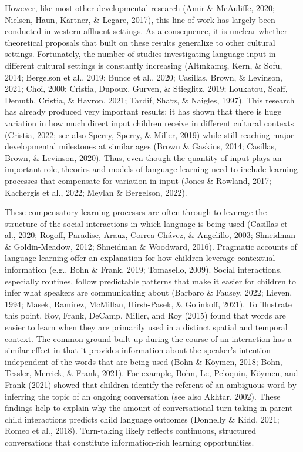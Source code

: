 \documentclass[
  man,floatsintext]{apa6}
\begin{document}
However, like most other developmental research (Amir \& McAuliffe, 2020; Nielsen, Haun, Kärtner, \& Legare, 2017), this line of work has largely been conducted in western affluent settings. As a consequence, it is unclear whether theoretical proposals that built on these results generalize to other cultural settings. Fortunately, the number of studies investigating language input in different cultural settings is constantly increasing (Altınkamış, Kern, \& Sofu, 2014; Bergelson et al., 2019; Bunce et al., 2020; Casillas, Brown, \& Levinson, 2021; Choi, 2000; Cristia, Dupoux, Gurven, \& Stieglitz, 2019; Loukatou, Scaff, Demuth, Cristia, \& Havron, 2021; Tardif, Shatz, \& Naigles, 1997). This research has already produced very important results: it has shown that there is huge variation in how much direct input children receive in different cultural contexts (Cristia, 2022; see also Sperry, Sperry, \& Miller, 2019) while still reaching major developmental milestones at similar ages (Brown \& Gaskins, 2014; Casillas, Brown, \& Levinson, 2020). Thus, even though the quantity of input plays an important role, theories and models of language learning need to include learning processes that compensate for variation in input (Jones \& Rowland, 2017; Kachergis et al., 2022; Meylan \& Bergelson, 2022).

These compensatory learning processes are often through to leverage the structure of the social interactions in which language is being used (Casillas et al., 2020; Rogoff, Paradise, Arauz, Correa-Chávez, \& Angelillo, 2003; Shneidman \& Goldin-Meadow, 2012; Shneidman \& Woodward, 2016). Pragmatic accounts of language learning offer an explanation for how children leverage contextual information (e.g., Bohn \& Frank, 2019; Tomasello, 2009). Social interactions, especially routines, follow predictable patterns that make it easier for children to infer what speakers are communicating about (Barbaro \& Fausey, 2022; Lieven, 1994; Masek, Ramirez, McMillan, Hirsh-Pasek, \& Golinkoff, 2021). To illustrate this point, Roy, Frank, DeCamp, Miller, and Roy (2015) found that words are easier to learn when they are primarily used in a distinct spatial and temporal context. The common ground built up during the course of an interaction has a similar effect in that it provides information about the speaker's intention independent of the words that are being used (Bohn \& Köymen, 2018; Bohn, Tessler, Merrick, \& Frank, 2021). For example, Bohn, Le, Peloquin, Köymen, and Frank (2021) showed that children identify the referent of an ambiguous word by inferring the topic of an ongoing conversation (see also Akhtar, 2002). These findings help to explain why the amount of conversational turn-taking in parent child interactions predicts child language outcomes (Donnelly \& Kidd, 2021; Romeo et al., 2018). Turn-taking likely reflects continuous, structured conversations that constitute information-rich learning opportunities.
\end{document}
